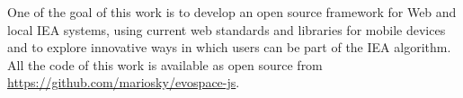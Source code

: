 \documentclass[letterpaper]{article}
\begin{document}
One of the  goal of this work is to develop an open source framework for Web and local
IEA systems, using current web standards and libraries for mobile devices and to explore 
innovative ways in which users can be part of the IEA algorithm. All the code of this work
is available as open source from \url{https://github.com/mariosky/evospace-js}. 















\end{document}

